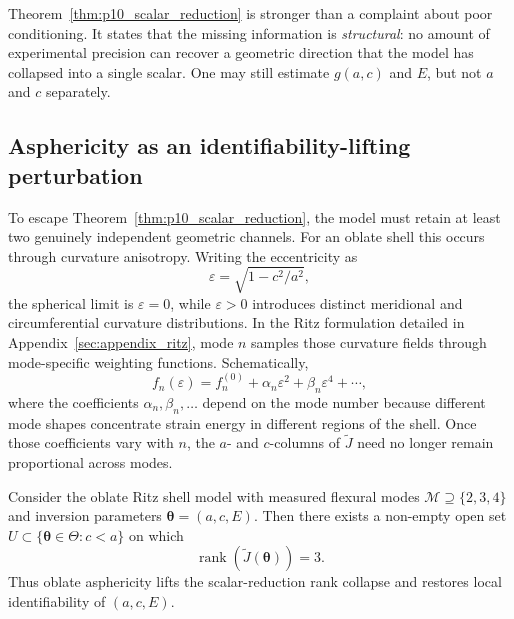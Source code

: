 Theorem~\ref{thm:p10_scalar_reduction} is stronger than a complaint about poor
conditioning.  It states that the missing information is \emph{structural}: no
amount of experimental precision can recover a geometric direction that the
model has collapsed into a single scalar.  One may still estimate $g(a,c)$ and
$E$, but not $a$ and $c$ separately.

\subsection{Asphericity as an identifiability-lifting perturbation}

To escape Theorem~\ref{thm:p10_scalar_reduction}, the model must retain at least
two genuinely independent geometric channels.  For an oblate shell this occurs
through curvature anisotropy.  Writing the eccentricity as
\begin{equation}
  \varepsilon = \sqrt{1 - c^2/a^2},
  \label{eq:p10_eccentricity}
\end{equation}
the spherical limit is $\varepsilon=0$, while $\varepsilon>0$ introduces
distinct meridional and circumferential curvature distributions.  In the Ritz
formulation detailed in Appendix~\ref{sec:appendix_ritz}, mode $n$ samples
those curvature fields through mode-specific weighting functions.
Schematically,
\begin{equation}
  f_n(\varepsilon)
  =
  f_n^{(0)} + \alpha_n \varepsilon^2 + \beta_n \varepsilon^4 + \cdots,
  \label{eq:p10_mode_expansion}
\end{equation}
where the coefficients $\alpha_n,\beta_n,\ldots$ depend on the mode number
because different mode shapes concentrate strain energy in different regions of
the shell.  Once those coefficients vary with $n$, the $a$- and $c$-columns of
$\widetilde{J}$ need no longer remain proportional across modes.

\begin{proposition}
\label{prop:p10_lifting}
Consider the oblate Ritz shell model with measured flexural modes
$\mathcal{M}\supseteq\{2,3,4\}$ and inversion parameters
$\boldsymbol{\theta}=(a,c,E)$.  Then there exists a non-empty open set
$U\subset\{\boldsymbol{\theta}\in\Theta:c<a\}$ on which
\begin{equation}
  \operatorname{rank}(\widetilde{J}(\boldsymbol{\theta})) = 3.
\end{equation}
Thus oblate asphericity lifts the scalar-reduction rank collapse and restores
local identifiability of $(a,c,E)$.
\end{proposition}

